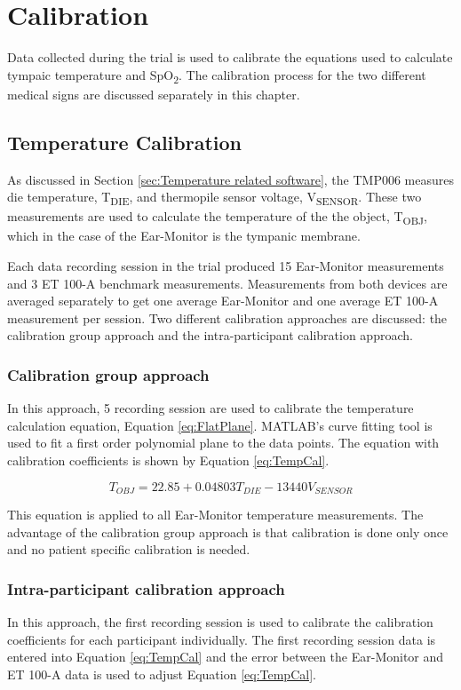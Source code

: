 \chapter{Calibration}
\label{chp:Calibration}
Data collected during the trial is used to calibrate the equations used to calculate tympaic temperature and SpO\textsubscript{2}. The calibration process for the two different medical signs are discussed separately in this chapter.

\section{Temperature Calibration}
As discussed in Section \ref{sec:Temperature related software}, the TMP006 measures die temperature, T\textsubscript{DIE}, and thermopile sensor voltage, V\textsubscript{SENSOR}. These two measurements are used to calculate the temperature of the the object, T\textsubscript{OBJ}, which in the case of the Ear-Monitor is the tympanic membrane.

\medskip

Each data recording session in the trial produced 15 Ear-Monitor measurements and 3 ET 100-A benchmark measurements. Measurements from both devices are averaged separately to get one average Ear-Monitor and one average ET 100-A measurement per session. Two different calibration approaches are discussed: the calibration group approach and the intra-participant calibration approach.

\subsection{Calibration group approach}
In this approach, 5 recording session are used to calibrate the temperature calculation equation, Equation \ref{eq:FlatPlane}. MATLAB's curve fitting tool is used to fit a first order polynomial plane to the data points. The equation with calibration coefficients is shown by Equation \ref{eq:TempCal}.

\begin{equation}
\label{eq:TempCal}
T_{OBJ}=22.85+ 0.04803 T_{DIE}-13440 V_{SENSOR}
\end{equation}

This equation is applied to all Ear-Monitor temperature measurements. The advantage of the calibration group approach is that calibration is done only once and no patient specific calibration is needed.

\subsection{Intra-participant calibration approach}
In this approach, the first recording session is used to calibrate the calibration coefficients for each participant individually. The first recording session data is entered into Equation \ref{eq:TempCal} and the error between the Ear-Monitor and ET 100-A data is used to adjust Equation \ref{eq:TempCal}.

